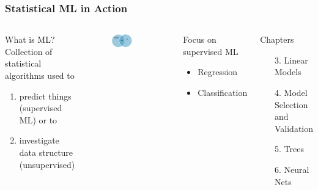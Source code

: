 \begin{frame}
	\frametitle{Statistical ML in Action}
	\begin{columns}
		\begin{block}{What is ML?}
			Collection of statistical algorithms used to
			\begin{enumerate}
				\item predict things (supervised ML) or to
				\item investigate data structure (unsupervised)
			\end{enumerate}
		\end{block}
		
		\begin{figure}
			\includegraphics[width=0.6\textwidth]{pics/ml.png}
		\end{figure}
		
		\begin{block}{Focus on supervised ML}
			\begin{itemize}
				\item Regression
				\item Classification
			\end{itemize}
		\end{block}
		
		\begin{block}{Chapters}
			\begin{itemize}
				\item[3.] Linear Models
				\item[4.] Model Selection and Validation
				\item[5.] Trees
				\item[6.] Neural Nets
			\end{itemize}
		\end{block}
	\end{columns}
\end{frame}

